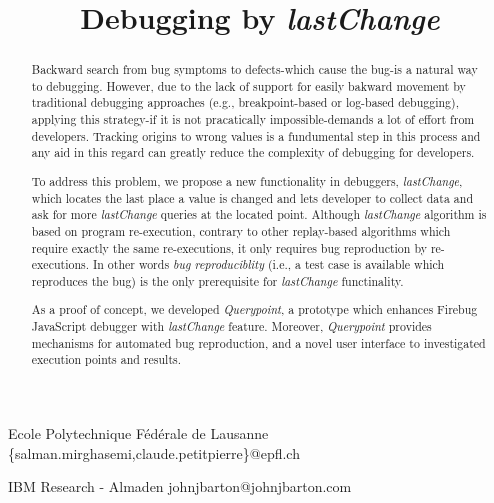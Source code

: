 \documentclass[preprint]{sigplanconf}
\begin{document}
\copyrightdata{[to be supplied]} 

\preprintfooter{}   %

\title{Debugging by \textit{lastChange}}
\subtitle{}

           {Ecole Polytechnique F\'ed\'erale de Lausanne}
           {\{salman.mirghasemi,claude.petitpierre\}@epfl.ch}

           {IBM Research - Almaden}
           {johnjbarton@johnjbarton.com}

\maketitle

\begin{abstract}
Backward search from bug symptoms to defects-which cause the bug-is a natural way to debugging. However, due to the lack of support for easily bakward movement by  traditional debugging approaches (e.g., breakpoint-based or log-based debugging), applying this strategy-if it is not pracatically impossible-demands a lot of effort from developers. Tracking origins to wrong values is a fundumental step in this process and any aid in this regard can greatly reduce the complexity of debugging for developers.

To address this problem, we propose a new functionality in debuggers, \textit{lastChange}, which locates the last place a value is changed and lets developer to collect data and ask for more \textit{lastChange} queries at the located point. Although \textit{lastChange} algorithm is based on program re-execution, contrary to other replay-based algorithms which require exactly the same re-executions, it only requires bug reproduction by re-executions. In other words \textit{bug reproduciblity} (i.e., a test case is available which reproduces the bug) is the only prerequisite for \textit{lastChange} functinality.

As a proof of concept, we developed \textit{Querypoint}, a prototype which enhances Firebug JavaScript debugger with \textit{lastChange} feature. Moreover, \textit{Querypoint} provides mechanisms for automated bug reproduction, and a novel user interface to investigated execution points and results.

\end{abstract}
\end{document}
